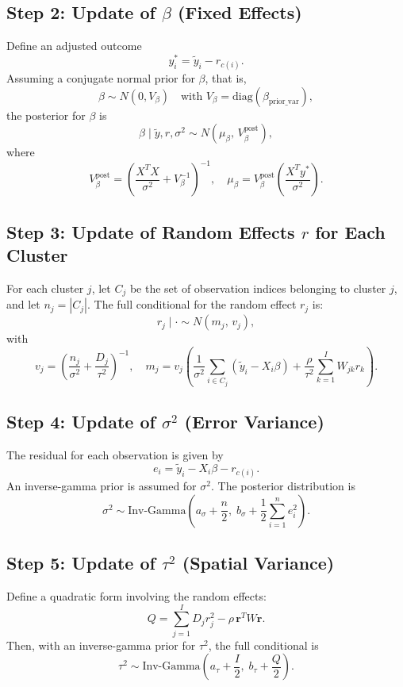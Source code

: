 \documentclass{article}
\begin{document}
\subsection*{Step 2: Update of $\beta$ (Fixed Effects)}
Define an adjusted outcome
\[
y_i^* = \tilde{y}_i - r_{c(i)}.
\]
Assuming a conjugate normal prior for $\beta$, that is,
\[
\beta \sim N(0, V_\beta) \quad \text{with } V_\beta=\text{diag}(\beta_{\text{prior_var}}),
\]
the posterior for $\beta$ is
\[
\beta \mid \tilde{y}, r, \sigma^2 \sim N\left(\mu_\beta,\, V_{\beta}^{\text{post}}\right),
\]
where
\[
V_{\beta}^{\text{post}} = \left(\frac{X^TX}{\sigma^2} + V_\beta^{-1} \right)^{-1}, \quad
\mu_\beta = V_{\beta}^{\text{post}} \left(\frac{X^T y^*}{\sigma^2}\right).
\]

\subsection*{Step 3: Update of Random Effects $r$ for Each Cluster}
For each cluster $j$, let $C_j$ be the set of observation indices belonging to cluster $j$, and let $n_j = |C_j|$. The full conditional for the random effect $r_j$ is:
\[
r_j \mid \cdot \sim N\left(m_j,\, v_j\right),
\]
with
\[
v_j = \left(\frac{n_j}{\sigma^2} + \frac{D_j}{\tau^2} \right)^{-1}, \quad
m_j = v_j\left( \frac{1}{\sigma^2} \sum_{i \in C_j} \left(\tilde{y}_i - X_i \beta\right) + \frac{\rho}{\tau^2} \sum_{k=1}^{I} W_{jk} r_k \right).
\]

\subsection*{Step 4: Update of $\sigma^2$ (Error Variance)}
The residual for each observation is given by
\[
e_i = \tilde{y}_i - X_i\beta - r_{c(i)}.
\]
An inverse-gamma prior is assumed for $\sigma^2$. The posterior distribution is
\[
\sigma^2 \sim \text{Inv-Gamma}\left(a_{\sigma} + \frac{n}{2}, \; b_{\sigma} + \frac{1}{2} \sum_{i=1}^n e_i^2 \right).
\]

\subsection*{Step 5: Update of $\tau^2$ (Spatial Variance)}
Define a quadratic form involving the random effects:
\[
Q = \sum_{j=1}^{I} D_j r_j^2 - \rho \, \mathbf{r}^T W \mathbf{r}.
\]
Then, with an inverse-gamma prior for $\tau^2$, the full conditional is
\[
\tau^2 \sim \text{Inv-Gamma}\left(a_{\tau} + \frac{I}{2}, \; b_{\tau} + \frac{Q}{2}\right).
\]
\end{document}
